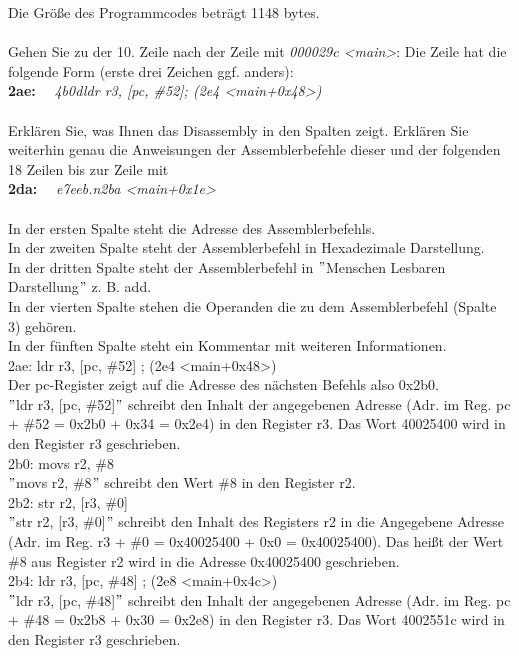 Die Grö\ss{}e des Programmcodes beträgt 1148 bytes.\\ \\
Gehen Sie zu der 10. Zeile nach der Zeile mit \textit{000029c <main>}: Die Zeile hat die folgende Form (erste drei Zeichen ggf. anders):\\
\textbf{2ae:}~~ \textit{4b0d\quad \quad \quad ldr \quad r3, [pc, \#52]\quad \quad ; (2e4 <main+0x48>)}\\ \\
Erklären Sie, was Ihnen das Disassembly in den Spalten zeigt. Erklären Sie weiterhin genau die Anweisungen der Assemblerbefehle dieser und der folgenden 18 Zeilen bis zur Zeile mit\\
\textbf{2da:}~~ \textit{e7ee\quad \quad \quad b.n\quad 2ba <main+0x1e>\quad \quad }\\ \\
In der ersten Spalte steht die Adresse des Assemblerbefehls.\\
In der zweiten Spalte steht der Assemblerbefehl in Hexadezimale Darstellung.\\
In der dritten Spalte steht der Assemblerbefehl in $"$Menschen Lesbaren Darstellung$"$ z. B. add.\\
In der vierten Spalte stehen die Operanden die zu dem Assemblerbefehl (Spalte 3) gehören.\\
In der fünften Spalte steht ein Kommentar mit weiteren Informationen.\\
2ae: ldr r3, [pc, \#52] ; (2e4 <main+0x48>)\\
Der pc-Register zeigt auf die Adresse des nächsten Befehls also 0x2b0.\\
$"$ldr r3, [pc, \#52]$"$ schreibt den Inhalt der angegebenen Adresse (Adr. im Reg. pc + \#52 = 0x2b0 + 0x34 = 0x2e4) in den Register r3. Das Wort 40025400 wird in den Register r3 geschrieben.\\
2b0: movs r2, \#8\\
$"$movs r2, \#8$"$ schreibt den Wert \#8 in den Register r2.\\
2b2: str r2, [r3, \#0]\\
$"$str r2, [r3, \#0]$"$ schreibt den Inhalt des Registers r2 in die Angegebene Adresse (Adr. im Reg. r3 + \#0 = 0x40025400 + 0x0 = 0x40025400). Das hei\ss{}t der Wert \#8 aus Register r2 wird in die Adresse 0x40025400 geschrieben.\\
2b4: ldr r3, [pc, \#48] ; (2e8 <main+0x4c>)\\
$"$ldr r3, [pc, \#48]$"$ schreibt den Inhalt der angegebenen Adresse (Adr. im Reg. pc + \#48 = 0x2b8 + 0x30 = 0x2e8) in den Register r3. Das Wort 4002551c wird in den Register r3 geschrieben.\\
